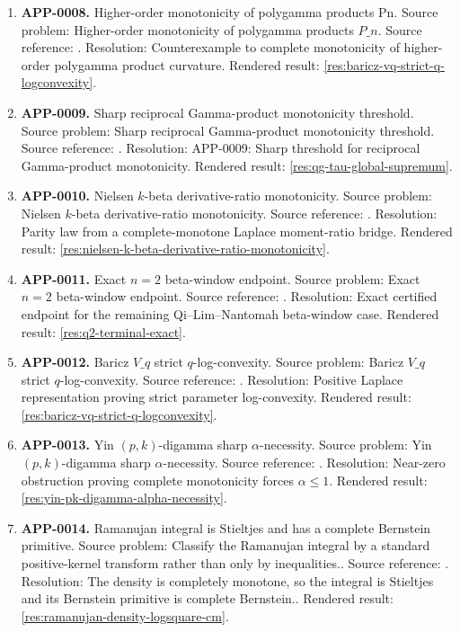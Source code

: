 \begin{enumerate}[leftmargin=*]
\item \textbf{APP-0008.} Higher-order monotonicity of polygamma products Pn.  Source problem: Higher-order monotonicity of polygamma products \(P\_n\). Source reference: \cite{app-app-0004-source}. Resolution: Counterexample to complete monotonicity of higher-order polygamma product curvature. Rendered result: \ref{res:baricz-vq-strict-q-logconvexity}.
\item \textbf{APP-0009.} Sharp reciprocal Gamma-product monotonicity threshold.  Source problem: Sharp reciprocal Gamma-product monotonicity threshold. Source reference: \cite{app-app-0009-source}. Resolution: APP-0009: Sharp threshold for reciprocal Gamma-product monotonicity. Rendered result: \ref{res:qg-tau-global-supremum}.
\item \textbf{APP-0010.} Nielsen \(k\)-beta derivative-ratio monotonicity.  Source problem: Nielsen \(k\)-beta derivative-ratio monotonicity. Source reference: \cite{yin-zhang-k-beta}. Resolution: Parity law from a complete-monotone Laplace moment-ratio bridge. Rendered result: \ref{res:nielsen-k-beta-derivative-ratio-monotonicity}.
\item \textbf{APP-0011.} Exact \(n=2\) beta-window endpoint.  Source problem: Exact \(n=2\) beta-window endpoint. Source reference: \cite{app-app-0004-source}. Resolution: Exact certified endpoint for the remaining Qi--Lim--Nantomah beta-window case. Rendered result: \ref{res:q2-terminal-exact}.
\item \textbf{APP-0012.} Baricz \(V\_q\) strict \(q\)-log-convexity.  Source problem: Baricz \(V\_q\) strict \(q\)-log-convexity. Source reference: \cite{baricz-turan-thesis}. Resolution: Positive Laplace representation proving strict parameter log-convexity. Rendered result: \ref{res:baricz-vq-strict-q-logconvexity}.
\item \textbf{APP-0013.} Yin \((p,k)\)-digamma sharp \(\alpha\)-necessity.  Source problem: Yin \((p,k)\)-digamma sharp \(\alpha\)-necessity. Source reference: \cite{yin-pk-digamma}. Resolution: Near-zero obstruction proving complete monotonicity forces \(\alpha\le1\). Rendered result: \ref{res:yin-pk-digamma-alpha-necessity}.
\item \textbf{APP-0014.} Ramanujan integral is Stieltjes and has a complete Bernstein primitive.  Source problem: Classify the Ramanujan integral by a standard positive-kernel transform rather than only by inequalities.. Source reference: \cite{mishra-swaminathan-ramanujan}. Resolution: The density is completely monotone, so the integral is Stieltjes and its Bernstein primitive is complete Bernstein.. Rendered result: \ref{res:ramanujan-density-logsquare-cm}.

\end{enumerate}
